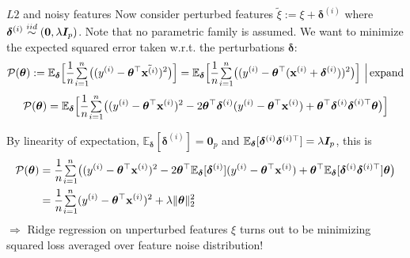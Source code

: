 \documentclass[11pt,compress,t,notes=noshow, xcolor=table]{beamer}
\begin{document}
\begin{vbframe}{$L2$ and noisy features}
Now consider perturbed features $ \tilde{\xi}:= \xi + \bm{\delta}^{(i)}$ where $\bm{\delta}^{(i)} \overset{iid}{\sim} (\bm{0},\lambda \boldsymbol{I}_p)$. Note that no parametric family is assumed. We want to minimize the expected squared error taken w.r.t. the perturbations $\bm{\delta}$:
$$\mathcal{P}(\bm{\theta}):= \mathbb{E}_{\bm{\delta}}\Big[\frac{1}{n}{\textstyle \sum\limits_{i=1}^n}\big((y^{(i)}-\bm{\theta}^{\top}\tilde{\mathbf{x}^{(i)}})^2\big)\Big] = \mathbb{E}_{\bm{\delta}}\Big[\frac{1}{n}{\textstyle \sum\limits_{i=1}^n}\big((y^{(i)}-\bm{\theta}^{\top}(\mathbf{x}^{(i)}+\bm{\delta}^{(i)}))^2\big)\Big]\,\,\Big|\, \text{expand}$$
\vspace{-0.2cm}
$$\mathcal{P}(\bm{\theta}) = \mathbb{E}_{\bm{\delta}}\Big[\frac{1}{n}{\textstyle \sum\limits_{i=1}^n}\big((y^{(i)}-\bm{\theta}^{\top}\mathbf{x}^{(i)})^2 - 2 \bm{\theta}^{\top}\bm{\delta}^{(i)}(y^{(i)}-\bm{\theta}^{\top}\mathbf{x}^{(i)}) + \bm{\theta}^{\top}\bm{\delta}^{(i)}\bm{{\delta}}^{(i) \top}\bm{\theta}\big)\Big]$$

By linearity of expectation, $\mathbb{E}_{\bm{\delta}}[\bm{\delta}^{(i)}]=\bm{0}_p$ and $\mathbb{E}_{\bm{\delta}}[\bm{\delta}^{(i)}\bm{\delta}^{(i)\top}]=\lambda \boldsymbol{I}_p$, this is
\vspace{-0.2cm}
%
\begin{align*}\mathcal{P}(\bm{\theta})&=\frac{1}{n}{\textstyle \sum\limits_{i=1}^n}\big((y^{(i)}-\bm{\theta}^{\top}\mathbf{x}^{(i)})^2 - 2 \bm{\theta}^{\top}\mathbb{E}_{\bm{\delta}}[\bm{\delta}^{(i)}](y^{(i)}-\bm{\theta}^{\top}\mathbf{x}^{(i)}) + \bm{\theta}^{\top}\mathbb{E}_{\bm{\delta}}[\bm{\delta}^{(i)}\bm{\delta}^{(i)\top}]\bm{\theta} \big) \\
&= \frac{1}{n}{\textstyle \sum\limits_{i=1}^n}(y^{(i)}-\bm{\theta}^{\top}\mathbf{x}^{(i)})^2+\lambda \Vert \bm{\theta} \Vert_2^2
\end{align*}
$\Longrightarrow$ Ridge regression on unperturbed features {\small $\xi$} turns out to be minimizing squared loss averaged over feature noise distribution!
\end{vbframe}
\end{document}
